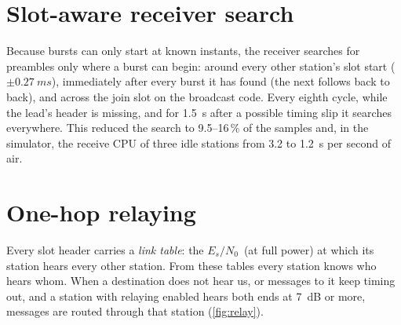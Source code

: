 \documentclass[11pt,a4paper,oneside]{report}
\newcommand{\EsNo}{\ensuremath{E_s/N_0}}
\begin{document}
\section{Slot-aware receiver search}\label{sec:search}
Because bursts can only start at known instants, the receiver searches for preambles only where a
burst can begin: around every other station's slot start ($\pm\SI{0.27}{ms}$), immediately after every
burst it has found (the next follows back to back), and across the join slot on the broadcast code.
Every eighth cycle, while the lead's header is missing, and for \SI{1.5}{s} after a possible timing slip
it searches everywhere. This reduced the search to 9.5--16\,\% of the samples and, in the simulator,
the receive CPU of three idle stations from 3.2 to \SI{1.2}{s} per second of air.

\section{One-hop relaying}\label{sec:relay}
Every slot header carries a \emph{link table}: the \EsNo\ (at full power) at which its station hears every
other station. From these tables every station knows who hears whom. When a destination does not hear
us, or messages to it keep timing out, and a station with relaying enabled hears both ends at
\SI{7}{dB} or more, messages are routed through that station (\cref{fig:relay}).
\end{document}
